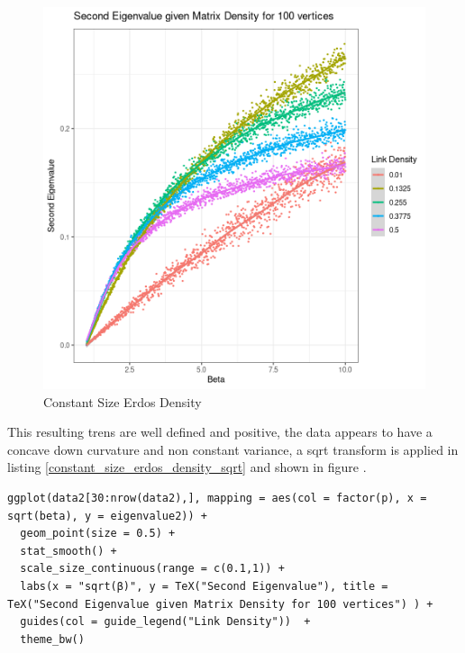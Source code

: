 \documentclass[11pt]{article}
\begin{document}
\begin{figure}[htbp]
\centering
\includegraphics[width=12cm]{media/constant_size_erdos_density.png}
\caption{\label{constant_size_erdos_density}Constant Size Erdos Density}
\end{figure}

This resulting trens are well defined and positive, the data appears to have a
concave down curvature and non constant variance, a sqrt transform is applied in
listing \ref{constant_size_erdos_density_sqrt} and shown in figure .


\begin{listing}[htbp]
\begin{verbatim}
ggplot(data2[30:nrow(data2),], mapping = aes(col = factor(p), x = sqrt(beta), y = eigenvalue2)) +
  geom_point(size = 0.5) +
  stat_smooth() +
  scale_size_continuous(range = c(0.1,1)) +
  labs(x = "sqrt(β)", y = TeX("Second Eigenvalue"), title = TeX("Second Eigenvalue given Matrix Density for 100 vertices") ) +
  guides(col = guide_legend("Link Density"))  +
  theme_bw()
\end{verbatim}
\caption{\label{constant_size_erdos_density_sqrt}listing:constant\textsubscript{size}\textsubscript{erdos}\textsubscript{density}\textsubscript{sqrt}}
\end{listing}
\end{document}
